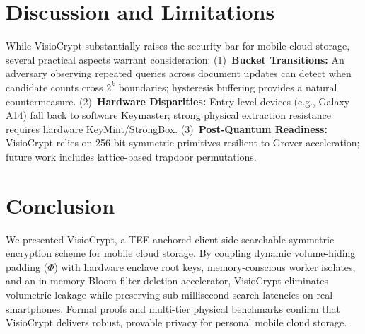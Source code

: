 \documentclass[10pt,conference]{IEEEtran}
\begin{document}
\section{Discussion and Limitations}
While VisioCrypt substantially raises the security bar for mobile cloud storage, several practical aspects warrant consideration: (1)~\textbf{Bucket Transitions:} An adversary observing repeated queries across document updates can detect when candidate counts cross $2^k$ boundaries; hysteresis buffering provides a natural countermeasure. (2)~\textbf{Hardware Disparities:} Entry-level devices (e.g., Galaxy A14) fall back to software Keymaster; strong physical extraction resistance requires hardware KeyMint/StrongBox. (3)~\textbf{Post-Quantum Readiness:} VisioCrypt relies on 256-bit symmetric primitives resilient to Grover acceleration; future work includes lattice-based trapdoor permutations.

\section{Conclusion}
We presented VisioCrypt, a TEE-anchored client-side searchable symmetric encryption scheme for mobile cloud storage. By coupling dynamic volume-hiding padding ($\Phi$) with hardware enclave root keys, memory-conscious worker isolates, and an in-memory Bloom filter deletion accelerator, VisioCrypt eliminates volumetric leakage while preserving sub-millisecond search latencies on real smartphones. Formal proofs and multi-tier physical benchmarks confirm that VisioCrypt delivers robust, provable privacy for personal mobile cloud storage.


\let\oldbibliography\thebibliography
\renewcommand{\thebibliography}[1]{%
  \oldbibliography{#1}%
  \scriptsize
  \setlength{\itemsep}{0pt plus 0.2pt}%
  \setlength{\parsep}{0pt}%
}

\end{document}
